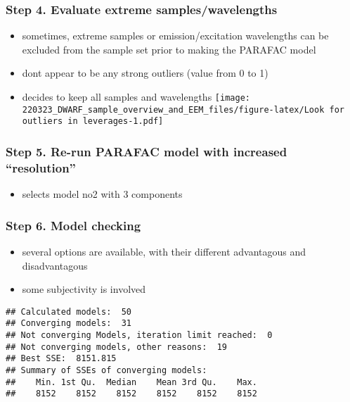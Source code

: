 \documentclass[
]{article}
\providecommand{\tightlist}{%
  \setlength{\itemsep}{0pt}\setlength{\parskip}{0pt}}
\begin{document}
\hypertarget{step-4.-evaluate-extreme-sampleswavelengths}{%
\subsubsection{Step 4. Evaluate extreme
samples/wavelengths}\label{step-4.-evaluate-extreme-sampleswavelengths}}

\begin{itemize}
\tightlist
\item
  sometimes, extreme samples or emission/excitation wavelengths can be
  excluded from the sample set prior to making the PARAFAC model
\item
  dont appear to be any strong outliers (value from 0 to 1)
\item
  decides to keep all samples and wavelengths
  \texttt{[image: 220323\_DWARF\_sample\_overview\_and\_EEM\_files/figure-latex/Look for outliers in leverages-1.pdf]}
\end{itemize}

\hypertarget{step-5.-re-run-parafac-model-with-increased-resolution}{%
\subsubsection{Step 5. Re-run PARAFAC model with increased
``resolution''}\label{step-5.-re-run-parafac-model-with-increased-resolution}}

\begin{itemize}
\tightlist
\item
  selects model no2 with 3 components
\end{itemize}

\hypertarget{step-6.-model-checking}{%
\subsubsection{Step 6. Model checking}\label{step-6.-model-checking}}

\begin{itemize}
\tightlist
\item
  several options are available, with their different advantagous and
  disadvantagous
\item
  some subjectivity is involved
\end{itemize}

\begin{verbatim}
## Calculated models:  50
## Converging models:  31
## Not converging Models, iteration limit reached:  0
## Not converging models, other reasons:  19
## Best SSE:  8151.815
## Summary of SSEs of converging models:
##    Min. 1st Qu.  Median    Mean 3rd Qu.    Max. 
##    8152    8152    8152    8152    8152    8152
\end{verbatim}
\end{document}

